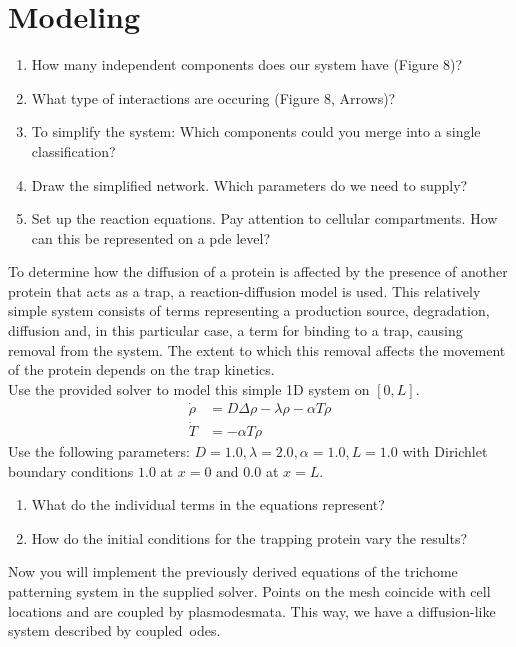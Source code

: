 \section{Modeling}
\begin{enumerate}
    \item How many independent components does our system have (Figure 8)?
    \item What type of interactions are occuring (Figure 8, Arrows)?
    \item To simplify the system: Which components could you merge into a single classification?
    \item Draw the simplified network.
    Which parameters do we need to supply?
    \item Set up the reaction equations.
    Pay attention to cellular compartments.
    How can this be represented on a \ac{pde} level?
\end{enumerate}
%
%
To determine how the diffusion of a protein is affected by the presence of another protein that acts as a trap, a reaction-diffusion model is used. This relatively simple system consists of terms representing a production
source, degradation, diffusion and, in this particular case, a term for binding to a trap, causing removal from the system. The extent to which this removal affects the movement of the protein depends on the trap kinetics.\\
Use the provided solver to model this simple 1D system on $[0,L]$.
\begin{align}
    \dot{\rho} &= D\Delta\rho - \lambda\rho - \alpha T\rho\\
    \dot{T} &= -\alpha T\rho
\end{align}
Use the following parameters: $D=1.0,\lambda=2.0,\alpha=1.0,L=1.0$ with Dirichlet boundary conditions $1.0$ at $x=0$ and $0.0$ at $x=L$.
\begin{enumerate}
    \item What do the individual terms in the equations represent?
    \item How do the initial conditions for the trapping protein vary the results?
\end{enumerate}
%
%
Now you will implement the previously derived equations of the trichome patterning system in the supplied solver.
Points on the mesh coincide with cell locations and are coupled by plasmodesmata.
This way, we have a diffusion-like system described by coupled~\acp{ode}.

